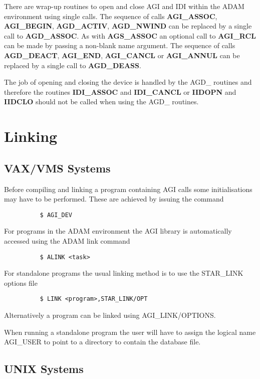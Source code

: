 There are wrap-up routines to open and close AGI and IDI within the
ADAM environment using single calls. The sequence of calls {\bf AGI\_ASSOC},
{\bf AGI\_BEGIN},  {\bf AGD\_ACTIV}, {\bf AGD\_NWIND} can be replaced by a
single call to {\bf AGD\_ASSOC}. As with {\bf AGS\_ASSOC} an optional call
to {\bf AGI\_RCL} can be made by passing a non-blank name argument.
The sequence of calls {\bf AGD\_DEACT}, {\bf AGI\_END}, {\bf AGI\_CANCL}
or {\bf AGI\_ANNUL} can be replaced by a single call to {\bf AGD\_DEASS}.

The job of opening and closing the device is handled by the AGD\_ routines
and therefore the routines {\bf IDI\_ASSOC} and {\bf IDI\_CANCL} or
{\bf IIDOPN} and {\bf IIDCLO} should not be called when using the
AGD\_ routines.


\section {Linking}

\subsection{VAX/VMS Systems}

Before compiling and linking a program containing AGI calls some
initialisations may have to be performed. These are achieved by issuing
the command
\begin{verbatim}
          $ AGI_DEV
\end{verbatim}

For programs in the ADAM environment the AGI library is automatically
accessed using the ADAM link command
\begin{verbatim}
          $ ALINK <task>
\end{verbatim}

For standalone programs the usual linking method is to use the STAR\_LINK
options file
\begin{verbatim}
          $ LINK <program>,STAR_LINK/OPT
\end{verbatim}
Alternatively a program can be linked using AGI\_LINK/OPTIONS.

When running a standalone program the user will have to assign the logical
name AGI\_USER to point to a directory to contain the database file.

\subsection{UNIX Systems}

